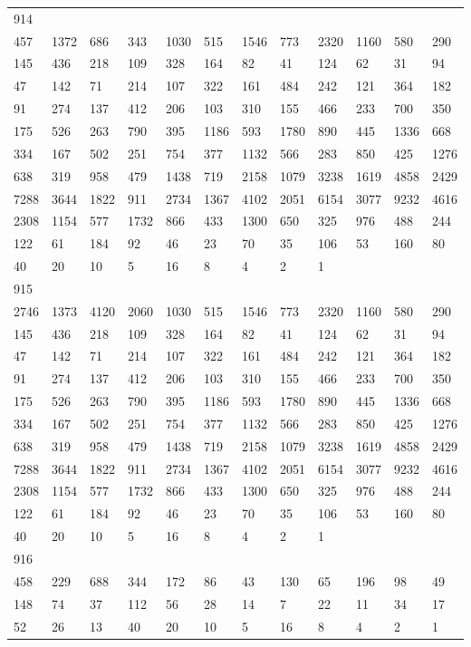 \begin{longtable}{llllllllllll}
914&&&&&&&&&&&\\
457& 1372& 686& 343& 1030& 515& 1546& 773& 2320& 1160& 580& 290\\
145& 436& 218& 109& 328& 164& 82& 41& 124& 62& 31& 94\\
47& 142& 71& 214& 107& 322& 161& 484& 242& 121& 364& 182\\
91& 274& 137& 412& 206& 103& 310& 155& 466& 233& 700& 350\\
175& 526& 263& 790& 395& 1186& 593& 1780& 890& 445& 1336& 668\\
334& 167& 502& 251& 754& 377& 1132& 566& 283& 850& 425& 1276\\
638& 319& 958& 479& 1438& 719& 2158& 1079& 3238& 1619& 4858& 2429\\
7288& 3644& 1822& 911& 2734& 1367& 4102& 2051& 6154& 3077& 9232& 4616\\
2308& 1154& 577& 1732& 866& 433& 1300& 650& 325& 976& 488& 244\\
122& 61& 184& 92& 46& 23& 70& 35& 106& 53& 160& 80\\
40& 20& 10& 5& 16& 8& 4& 2& 1& \\

915&&&&&&&&&&&\\
2746& 1373& 4120& 2060& 1030& 515& 1546& 773& 2320& 1160& 580& 290\\
145& 436& 218& 109& 328& 164& 82& 41& 124& 62& 31& 94\\
47& 142& 71& 214& 107& 322& 161& 484& 242& 121& 364& 182\\
91& 274& 137& 412& 206& 103& 310& 155& 466& 233& 700& 350\\
175& 526& 263& 790& 395& 1186& 593& 1780& 890& 445& 1336& 668\\
334& 167& 502& 251& 754& 377& 1132& 566& 283& 850& 425& 1276\\
638& 319& 958& 479& 1438& 719& 2158& 1079& 3238& 1619& 4858& 2429\\
7288& 3644& 1822& 911& 2734& 1367& 4102& 2051& 6154& 3077& 9232& 4616\\
2308& 1154& 577& 1732& 866& 433& 1300& 650& 325& 976& 488& 244\\
122& 61& 184& 92& 46& 23& 70& 35& 106& 53& 160& 80\\
40& 20& 10& 5& 16& 8& 4& 2& 1& \\

916&&&&&&&&&&&\\
458& 229& 688& 344& 172& 86& 43& 130& 65& 196& 98& 49\\
148& 74& 37& 112& 56& 28& 14& 7& 22& 11& 34& 17\\
52& 26& 13& 40& 20& 10& 5& 16& 8& 4& 2& 1\\


\end{longtable}
